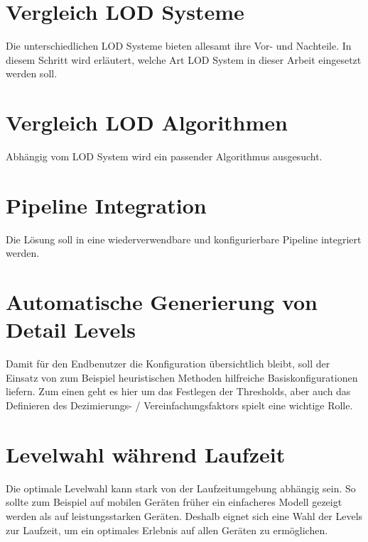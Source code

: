\section{Vergleich LOD Systeme}
Die unterschiedlichen LOD Systeme bieten allesamt ihre Vor- und Nachteile. In diesem Schritt wird erläutert, welche Art LOD System in dieser Arbeit eingesetzt werden soll.

\section{Vergleich LOD Algorithmen}
Abhängig vom LOD System wird ein passender Algorithmus ausgesucht.

\section{Pipeline Integration}
Die Lösung soll in eine wiederverwendbare und konfigurierbare Pipeline integriert werden.

\section{Automatische Generierung von Detail Levels}
Damit für den Endbenutzer die Konfiguration übersichtlich bleibt, soll der Einsatz von zum Beispiel heuristischen Methoden hilfreiche Basiskonfigurationen liefern.
Zum einen geht es hier um das Festlegen der Thresholds, aber auch das Definieren des Dezimierungs- / Vereinfachungsfaktors spielt eine wichtige Rolle.

\section{Levelwahl während Laufzeit}
Die optimale Levelwahl kann stark von der Laufzeitumgebung abhängig sein. So sollte zum Beispiel auf mobilen Geräten früher ein einfacheres Modell gezeigt werden als auf leistungsstarken Geräten.
Deshalb eignet sich eine Wahl der Levels zur Laufzeit, um ein optimales Erlebnis auf allen Geräten zu ermöglichen.
